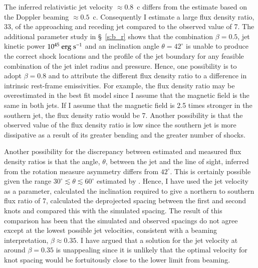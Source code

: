 The inferred relativistic jet velocity $\approx 0.8$~c differs from the estimate based on the Doppler beaming $\approx 0.5$~c. Consequently I estimate a large flux density ratio, 33, of the approaching and receding jet compared to the observed value of 7. The additional parameter study in \S~\ref{s:b_r} shows that the combination $\beta = 0.5$, jet kinetic power $10^{45} \rm \ erg \ s^{-1}$ and an inclination angle $\theta=42^\circ$ is unable to produce the correct shock locations and the profile of the jet boundary for any feasible combination of the jet inlet radius and pressure. Hence, one possibility is to adopt $\beta= 0.8$ and to attribute the different flux density ratio to a difference in intrinsic rest-frame emissivities. For example, the flux density ratio may be overestimated in the best fit model since I assume that the magnetic field is the same in both jets. If I assume that the magnetic field is 2.5 times stronger in the southern jet, the flux density ratio would be 7. Another possibility is that the observed value of the flux density ratio is low since the southern jet is more dissipative as a result of its greater bending and the greater number of shocks. 

Another possibility for the discrepancy between estimated and measured flux density ratios is that the angle, $\theta$, between the jet and the line of sight, inferred from the rotation measure asymmetry \citep[see][]{taylor93} differs from $42^\circ$. This is certainly possible given the range $30^\circ \lesssim \theta \lesssim 60^\circ$  estimated by \citet{taylor93}. Hence, I have used the jet velocity as a parameter, calculated the inclination required to give a northern to southern flux ratio of 7, calculated the deprojected spacing between the first and second knots and compared this with the simulated spacing. The result of this comparison has been that the simulated and observed spacings do not agree except at the lowest possible jet velocities, consistent with a beaming interpretation, $\beta \approx 0.35$. I have argued that a solution for the jet velocity at around $\beta = 0.35$ is unappealing since it is unlikely that the optimal velocity for knot spacing would be fortuitously close to the lower limit from beaming. 

